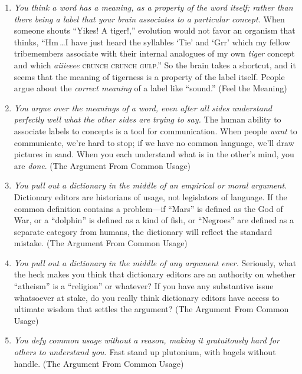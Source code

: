 {\begin{enumerate}
\item {
 \textit{You think a word has a meaning, as a property of the word
itself; rather than there being a label that your brain associates to a
particular concept.} When someone shouts ``Yikes! A
tiger!,'' evolution would not favor an organism that
thinks, ``Hm\,\ldots I have just heard the syllables
`Tie' and
`Grr' which my fellow tribemembers
associate with their internal analogues of my own \textit{tiger}
concept and which \textit{aiiieeee} \textsc{crunch crunch
gulp}.'' So the brain takes a shortcut, and it seems
that the meaning of tigerness is a property of the label itself. People
argue about the \textit{correct meaning} of a label like
``sound.'' (Feel the Meaning)}

\item {
 \textit{You argue over the meanings of a word, even after all
sides understand perfectly well what the other sides are trying to
say.} The human ability to associate labels to concepts is a tool for
communication. When people \textit{want} to communicate,
we're hard to stop; if we have no common language,
we'll draw pictures in sand. When you each understand
what is in the other's mind, you are \textit{done}.
(The Argument From Common Usage)}

\item {
 \textit{You pull out a dictionary in the middle of an empirical or
moral argument.} Dictionary editors are historians of usage, not
legislators of language. If the common definition contains a
problem---if ``Mars'' is defined as
the God of War, or a ``dolphin'' is
defined as a kind of fish, or
``Negroes'' are defined as a
separate category from humans, the dictionary will reflect the standard
mistake. (The Argument From Common Usage)}

\item {
 \textit{You pull out a dictionary in the middle of any argument
ever.} Seriously, what the heck makes you think that dictionary editors
are an authority on whether
``atheism'' is a
``religion'' or whatever? If you
have any substantive issue whatsoever at stake, do you really think
dictionary editors have access to ultimate wisdom that settles the
argument? (The Argument From Common Usage)}

\item {
 \textit{You defy common usage without a reason, making it
gratuitously hard for others to understand you.} Fast stand up
plutonium, with bagels without handle. (The Argument From Common
Usage)}


\end{enumerate}}
